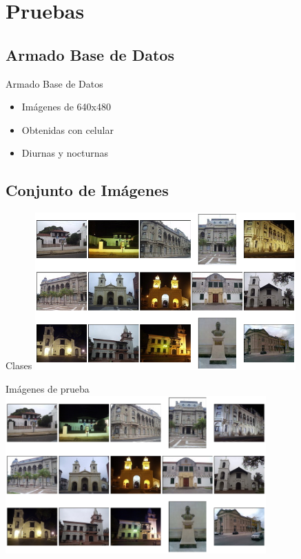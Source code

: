 \documentclass[spanish]{beamer}
\begin{document}
\section{Pruebas}
%
\subsection{Armado Base de Datos}
\begin{frame}{Armado Base de Datos}
  \begin{itemize}
  \item Imágenes de 640x480
  \item Obtenidas con celular
  \item Diurnas y nocturnas
  \end{itemize}
\end{frame}
%
\subsection{Conjunto de Imágenes}
\begin{frame}{Clases}
  \includegraphics[width=10cm]{img/mosaico.png}
\end{frame}
%
\begin{frame}{Imágenes de prueba}
  \includegraphics[width=10cm]{img/pruebas.png}
\end{frame}
%
\end{document}
